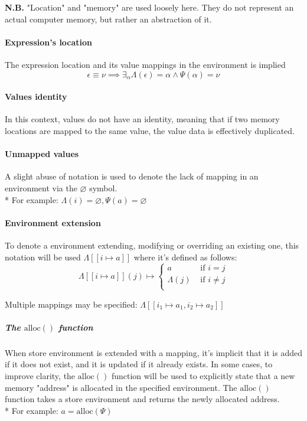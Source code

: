 \documentclass[11pt]{report}
\newcommand{\nb}[1]{\textbf{N.B. } #1}
\newcommand{\alloc}{\mathrm{alloc}}
\newcommand{\addr}{\alpha}
\newcommand{\expr}{\epsilon}
\newcommand{\val}{\nu}
\newcommand{\env}[1]{[\![#1]\!]}
\newcommand{\EnvLoc}{\Lambda}
\newcommand{\EnvStore}{\Psi}
\theoremstyle{definition}
\begin{document}
\nb{
	"Location" and "memory" are used loosely here. They do not represent an
	actual computer memory, but rather an abstraction of it.
}

\paragraph{Expression's location} The expression location and its value
mappings in the environment is implied
\[
	\expr\equiv\val
	\implies \exists_\addr{\EnvLoc(\expr)=\addr \land \EnvStore(\addr)=\val}
\]

\paragraph{Values identity} In this context, values do not have an identity,
meaning that if two memory locations are mapped to the same value, the value
data is effectively duplicated.

\paragraph{Unmapped values} A slight abuse of notation is used to denote the
lack of mapping in an environment via the $\varnothing$ symbol.\\*
For example: $\EnvLoc(i) = \varnothing, \EnvStore(a) = \varnothing$

\paragraph{Environment extension} To denote a environment extending, modifying
or overriding an existing one, this notation will be used $\EnvLoc\env{i \mapsto
a}$ where it's defined as follows:
\[
	\EnvLoc\env{i \mapsto a}(j) \mapsto \begin{cases}
		a          &\text{ if } i = j\\
		\EnvLoc(j) &\text{ if } i \neq j\\
	\end{cases}
\]

Multiple mappings may be specified: $\EnvLoc\env{i_1 \mapsto a_1, i_2 \mapsto a_2}$

\subparagraph{The $\alloc()$ function} When store environment is extended with
a mapping, it's implicit that it is added if it does not exist, and it is
updated if it already exists. In some cases, to improve clarity, the $\alloc()$
function will be used to explicitly state that a new memory "address" is
allocated in the specified environment. The $\alloc()$ function takes a store
environment and returns the newly allocated address.\\*
For example: $a = \alloc(\EnvStore)$
\end{document}
